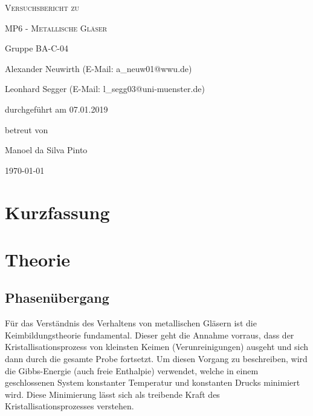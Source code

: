 \documentclass[
	a4paper,
	12pt,
	pagesize,
	ngerman
]{scrartcl}
\begin{document}
	\begin{titlepage}
		\centering
		{\scshape\LARGE Versuchsbericht zu \par}
		\vspace{1cm}
		{\scshape\huge MP6 - Metallische Gläser \par}
		\vspace{2.5cm}
		{\LARGE Gruppe BA-C-04 \par}
		\vspace{0.5cm}

		{\large Alexander Neuwirth (E-Mail: a\_neuw01@wwu.de) \par}
		{\large Leonhard Segger (E-Mail: l\_segg03@uni-muenster.de) \par}
		\vfill

		durchgeführt am 07.01.2019\par
		betreut von\par
		{\large Manoel da Silva Pinto}

		\vfill

		{\large \today\par}
	\end{titlepage}
	\tableofcontents
	\newpage

	\section{Kurzfassung}

  \section{Theorie}

	\subsection{Phasenübergang}

	Für das Verständnis des Verhaltens von metallischen Gläsern ist die Keimbildungstheorie fundamental.
	Dieser geht die Annahme vorraus, dass der Kristallisationsprozess von kleinsten Keimen (Verunreinigungen) ausgeht und sich dann durch die gesamte Probe fortsetzt. %
	Um diesen Vorgang zu beschreiben, wird die Gibbs-Energie (auch freie Enthalpie) verwendet, welche in einem geschlossenen System konstanter Temperatur und konstanten Drucks minimiert wird. %
	Diese Minimierung lässt sich als treibende Kraft des Kristallisationsprozesses verstehen.
\end{document}
